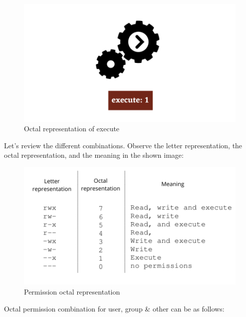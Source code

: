 \begin{flushleft}
\begin{figure}[h!]
	\centering
	\includegraphics[scale=0.4]{content/chapter5/images/69.png}
	\caption{Octal representation of execute}
	\label{fig:execute}
\end{figure}

\newpage

Let's review the different combinations. Observe the letter representation, the octal representation, and the meaning in the shown image:

\begin{figure}[h!]
	\centering
	\includegraphics[scale=0.4]{content/chapter5/images/perm4.png}
	\caption{Permission octal representation}
	\label{fig:combination_permission1}
\end{figure}

Octal permission combination for user, group \& other can be as follows:


\end{flushleft}
